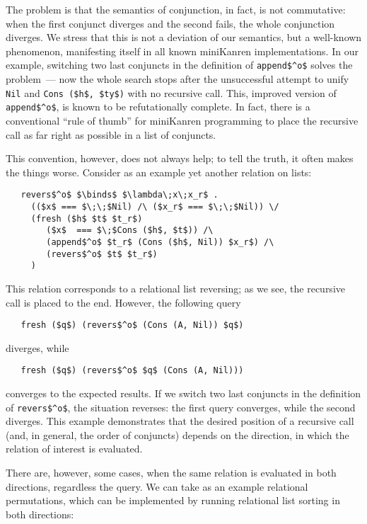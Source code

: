 The problem is that the semantics of conjunction, in fact, is not commutative: when the first conjunct diverges and the second fails, the whole
conjunction diverges. We stress that this is not a deviation of our semantics, but a well-known phenomenon, manifesting itself in all known
miniKanren implementations. In our example, switching two last conjuncts in the definition of \lstinline|append$^o$| solves the problem~---
now the whole search stops after the unsuccessful attempt to unify \lstinline|Nil| and \lstinline|Cons ($h$, $ty$)| with no recursive call.
This, improved version of \lstinline|append$^o$|, is known to be refutationally complete. In fact, there is a conventional ``rule of thumb''
for miniKanren programming to place the recursive call as far right as possible in a list of conjuncts. 

This convention, however, does not always help; to tell the truth, it often makes the things worse. Consider 
as an example yet another relation on lists:

\begin{lstlisting}
   revers$^o$ $\binds$ $\lambda\;x\;x_r$ . 
     (($x$ === $\;\;$Nil) /\ ($x_r$ === $\;\;$Nil)) \/
     (fresh ($h$ $t$ $t_r$)
        ($x$  === $\;$Cons ($h$, $t$)) /\
        (append$^o$ $t_r$ (Cons ($h$, Nil)) $x_r$) /\
        (revers$^o$ $t$ $t_r$)
     )
\end{lstlisting}

This relation corresponds to a relational list reversing; as we see, the recursive call is placed to
the end. However, the following query

\begin{lstlisting}
   fresh ($q$) (revers$^o$ (Cons (A, Nil)) $q$)
\end{lstlisting}

\noindent diverges, while

\begin{lstlisting}
   fresh ($q$) (revers$^o$ $q$ (Cons (A, Nil)))
\end{lstlisting}

\noindent converges to the expected results. If we switch two last conjuncts in the definition of
\lstinline|revers$^o$|, the situation reverses: the first query converges, while the second diverges. 
This example demonstrates that the desired position of a recursive call (and, in general, the order of
conjuncts) depends on the direction, in which the relation of interest is evaluated.

There are, however, some cases, when the same relation is evaluated in both directions, regardless
the query. We can take as an example relational permutations, which can be implemented by running
relational list sorting in both directions:


